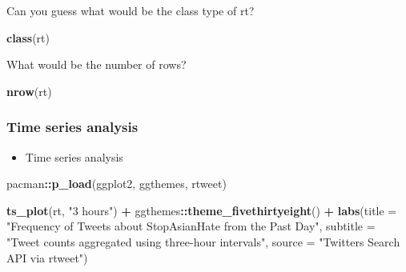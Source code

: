 \documentclass[
]{book}
\newenvironment{Shaded}{\begin{snugshade}}{\end{snugshade}}
\newcommand{\CommentTok}[1]{\textcolor[rgb]{0.56,0.35,0.01}{\textit{#1}}}
\newcommand{\DataTypeTok}[1]{\textcolor[rgb]{0.13,0.29,0.53}{#1}}
\newcommand{\DecValTok}[1]{\textcolor[rgb]{0.00,0.00,0.81}{#1}}
\newcommand{\KeywordTok}[1]{\textcolor[rgb]{0.13,0.29,0.53}{\textbf{#1}}}
\newcommand{\NormalTok}[1]{#1}
\newcommand{\OperatorTok}[1]{\textcolor[rgb]{0.81,0.36,0.00}{\textbf{#1}}}
\newcommand{\OtherTok}[1]{\textcolor[rgb]{0.56,0.35,0.01}{#1}}
\newcommand{\StringTok}[1]{\textcolor[rgb]{0.31,0.60,0.02}{#1}}
\providecommand{\tightlist}{%
  \setlength{\itemsep}{0pt}\setlength{\parskip}{0pt}}
\begin{document}
\begin{Shaded}
\end{Shaded}

Can you guess what would be the class type of rt?

\begin{Shaded}
\begin{Highlighting}[]
\KeywordTok{class}\NormalTok{(rt)}
\end{Highlighting}
\end{Shaded}

What would be the number of rows?

\begin{Shaded}
\begin{Highlighting}[]
\KeywordTok{nrow}\NormalTok{(rt)}
\end{Highlighting}
\end{Shaded}

\hypertarget{time-series-analysis}{%
\subsubsection{Time series analysis}\label{time-series-analysis}}

\begin{itemize}
\tightlist
\item
  Time series analysis
\end{itemize}

\begin{Shaded}
\begin{Highlighting}[]
\NormalTok{pacman}\OperatorTok{::}\KeywordTok{p\_load}\NormalTok{(ggplot2, ggthemes, rtweet)}

\KeywordTok{ts\_plot}\NormalTok{(rt, }\StringTok{"3 hours"}\NormalTok{) }\OperatorTok{+}
\StringTok{  }\NormalTok{ggthemes}\OperatorTok{::}\KeywordTok{theme\_fivethirtyeight}\NormalTok{() }\OperatorTok{+}
\StringTok{  }\KeywordTok{labs}\NormalTok{(}\DataTypeTok{title =} \StringTok{"Frequency of Tweets about StopAsianHate from the Past Day"}\NormalTok{,}
       \DataTypeTok{subtitle =} \StringTok{"Tweet counts aggregated using three{-}hour intervals"}\NormalTok{,}
       \DataTypeTok{source =} \StringTok{"Twitter\textquotesingle{}s Search API via rtweet"}\NormalTok{)}
\end{Highlighting}
\end{Shaded}
\end{document}
